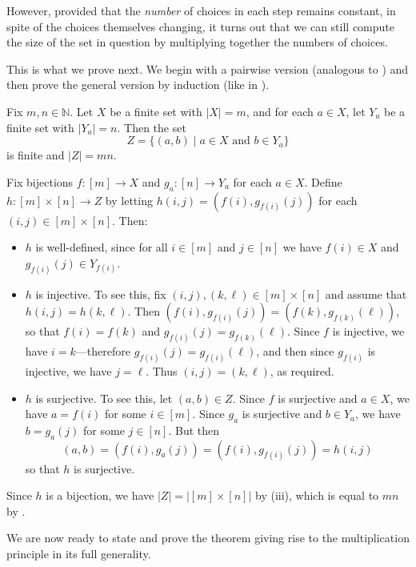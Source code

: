 However, provided that the \textit{number} of choices in each step remains constant, in spite of the choices themselves changing, it turns out that we can still compute the size of the set in question by multiplying together the numbers of choices.

This is what we prove next. We begin with a pairwise version (analogous to ) and then prove the general version by induction (like in ).

\begin{lemma}
\label{lemMultiplicationPrinciplePairwise}
Fix $m,n \in \mathbb{N}$. Let $X$ be a finite set with $|X|=m$, and for each $a \in X$, let $Y_a$ be a finite set with $|Y_a|=n$. Then the set
\[ Z = \{ (a, b) \mid a \in X \text{ and } b \in Y_a \} \]
is finite and $|Z| = mn$.
\end{lemma}

\begin{cproof}
Fix bijections $f : [m] \to X$ and $g_a : [n] \to Y_a$ for each $a \in X$. Define $h : [m] \times [n] \to Z$ by letting $h(i,j) = (f(i), g_{f(i)}(j))$ for each $(i,j) \in [m] \times [n]$. Then:
\begin{itemize}
\item $h$ is well-defined, since for all $i \in [m]$ and $j \in [n]$ we have $f(i) \in X$ and $g_{f(i)}(j) \in Y_{f(i)}$.
\item $h$ is injective. To see this, fix $(i,j), (k,\ell) \in [m] \times [n]$ and assume that $h(i,j) = h(k,\ell)$. Then $(f(i),g_{f(i)}(j)) = (f(k),g_{f(k)}(\ell))$, so that $f(i)=f(k)$ and $g_{f(i)}(j) = g_{f(k)}(\ell)$. Since $f$ is injective, we have $i=k$---therefore $g_{f(i)}(j) = g_{f(i)}(\ell)$, and then since $g_{f(i)}$ is injective, we have $j=\ell$. Thus $(i,j) = (k,\ell)$, as required.
\item $h$ is surjective. To see this, let $(a,b) \in Z$. Since $f$ is surjective and $a \in X$, we have $a=f(i)$ for some $i \in [m]$. Since $g_a$ is surjective and $b \in Y_a$, we have $b=g_a(j)$ for some $j \in [n]$. But then
\[ (a,b) = (f(i), g_a(j)) = (f(i), g_{f(i)}(j)) = h(i,j) \]
so that $h$ is surjective.
\end{itemize}

Since $h$ is a bijection, we have $|Z| = |[m] \times [n]|$ by (iii), which is equal to $mn$ by .
\end{cproof}

We are now ready to state and prove the theorem giving rise to the multiplication principle in its full generality.

